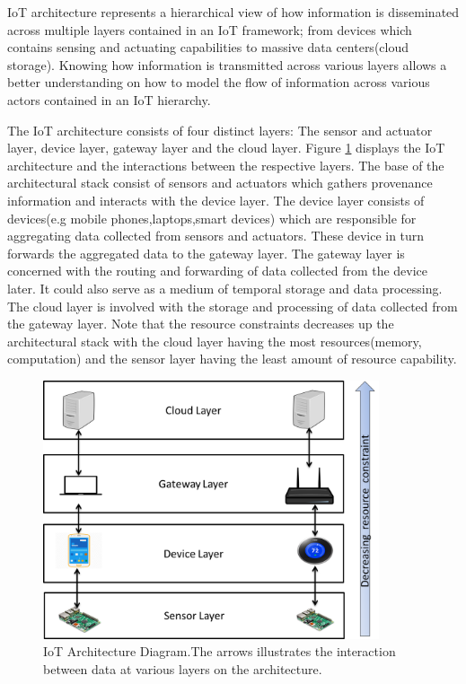 IoT architecture represents a hierarchical view of how information is disseminated across multiple layers contained in an IoT framework; from devices which contains sensing and actuating capabilities to massive data centers(cloud storage). Knowing how information is transmitted across various layers allows a better understanding on how to model the flow of information across various actors contained in an IoT hierarchy. 
\par The IoT architecture consists of four distinct layers: The sensor and actuator layer, device layer, gateway layer and the cloud layer. Figure \ref{iot_architecture} displays the IoT architecture and the interactions between the respective  layers. The base of the architectural stack consist of sensors and actuators which gathers provenance information and interacts with the device layer. The device layer consists of devices(e.g mobile phones,laptops,smart devices) which are responsible for aggregating data collected from sensors and actuators. These device in turn forwards the aggregated data to the gateway layer. The gateway layer is concerned with the routing and forwarding of data collected from the device later. It could also serve as a medium of temporal storage and data processing. The cloud layer is involved with the storage and processing of data collected from the gateway layer. Note that the resource constraints decreases up the architectural stack with the cloud layer having the most resources(memory, computation) and the sensor layer having the least amount of resource capability. 


\begin{figure}[h]
\begin{center}

\includegraphics[height=3.0in]{iot_architecture.png}
\end{center}
\caption{IoT Architecture Diagram.The arrows illustrates the interaction between data at various layers on the architecture.}
\label{iot_architecture}

\end{figure}



